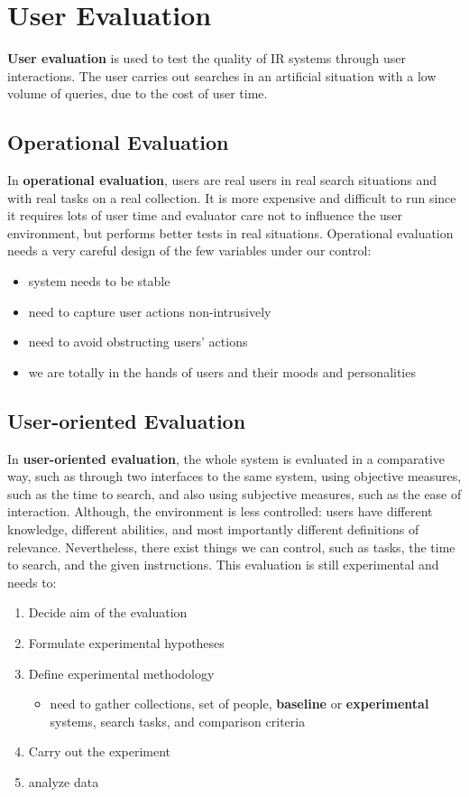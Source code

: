 \documentclass{article}
\begin{document}
\newpage

\section{User Evaluation}
\textbf{User evaluation} is used to test the quality of IR systems through user interactions.
The user carries out searches in an artificial situation with a low volume of queries, due to the cost of user time.

\subsection{Operational Evaluation}
In \textbf{operational evaluation}, users are real users in real search situations and with real tasks on a real collection. It is more expensive and difficult to run since it requires lots of user time and evaluator care not to influence the user environment, but performs better tests in real situations.
Operational evaluation needs a very careful design of the few variables under our control:
\begin{itemize}
    \item system needs to be stable
    \item need to capture user actions non-intrusively
    \item need to avoid obstructing users' actions
    \item we are totally in the hands of users and their moods and personalities
\end{itemize}

\subsection{User-oriented Evaluation}
In \textbf{user-oriented evaluation}, the whole system is evaluated in a comparative way, such as through two interfaces to the same system, using objective measures, such as the time to search, and also using subjective measures, such as the ease of interaction. Although, the environment is less controlled: users have different knowledge, different abilities, and most importantly different definitions of relevance. Nevertheless, there exist things we can control, such as tasks, the time to search, and the given instructions. This evaluation is still experimental and needs to:
\begin{enumerate}
    \item Decide aim of the evaluation
    \item Formulate experimental hypotheses
    \item Define experimental methodology
        \begin{itemize}
            \item need to gather collections, set of people, \textbf{baseline} or \textbf{experimental} systems, search tasks, and comparison criteria
        \end{itemize}
    \item Carry out the experiment
    \item analyze data
\end{enumerate}
\end{document}
